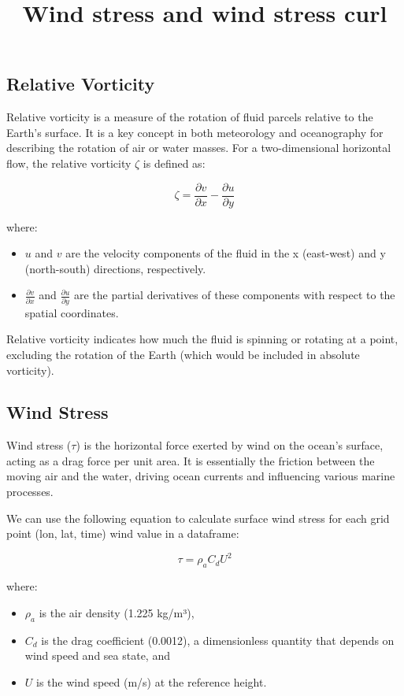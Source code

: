 \documentclass[
  letterpaper,
  DIV=11,
  numbers=noendperiod]{scrartcl}
\title{Wind stress and wind stress curl}
\author{}
\date{}
\providecommand{\tightlist}{%
  \setlength{\itemsep}{0pt}\setlength{\parskip}{0pt}}\usepackage{longtable,booktabs,array}
\begin{document}
\maketitle

\subsection{Relative Vorticity}\label{relative-vorticity}

Relative vorticity is a measure of the rotation of fluid parcels
relative to the Earth's surface. It is a key concept in both meteorology
and oceanography for describing the rotation of air or water masses. For
a two-dimensional horizontal flow, the relative vorticity \(\zeta\) is
defined as:

\[
\zeta = \frac{\partial v}{\partial x} - \frac{\partial u}{\partial y}
\]

where:

\begin{itemize}
\tightlist
\item
  \(u\) and \(v\) are the velocity components of the fluid in the x
  (east-west) and y (north-south) directions, respectively.
\item
  \(\frac{\partial v}{\partial x}\) and
  \(\frac{\partial u}{\partial y}\) are the partial derivatives of these
  components with respect to the spatial coordinates.
\end{itemize}

Relative vorticity indicates how much the fluid is spinning or rotating
at a point, excluding the rotation of the Earth (which would be included
in absolute vorticity).

\subsection{Wind Stress}\label{wind-stress}

Wind stress (\(\tau\)) is the horizontal force exerted by wind on the
ocean's surface, acting as a drag force per unit area. It is essentially
the friction between the moving air and the water, driving ocean
currents and influencing various marine processes.

We can use the following equation to calculate surface wind stress for
each grid point (lon, lat, time) wind value in a dataframe:

\[\tau = \rho_{a}C_{d}U^{2}\]

where:

\begin{itemize}
\tightlist
\item
  \(\rho_{a}\) is the air density (1.225 kg/m³),
\item
  \(C_{d}\) is the drag coefficient (0.0012), a dimensionless quantity
  that depends on wind speed and sea state, and
\item
  \(U\) is the wind speed (m/s) at the reference height.
\end{itemize}
\end{document}
